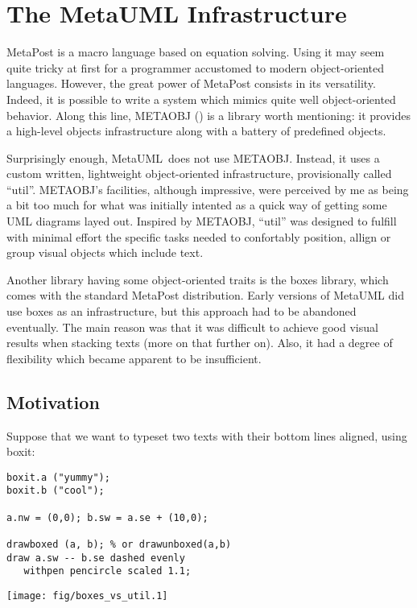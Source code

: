 \documentclass{article}
\newcommand{\code}{\ttfamily}
\newcommand{\metauml}{MetaUML}
\begin{document}
\section{The MetaUML Infrastructure}
\label{section:infrastructure}

MetaPost is a macro language based on equation solving. Using it may seem quite
tricky at first for a programmer accustomed to modern object-oriented languages.
However, the great power of MetaPost consists in its versatility. Indeed, it is possible to write
a system which mimics quite well object-oriented behavior. Along this line, METAOBJ
(\cite{metaobj}) is a library worth mentioning: it provides a high-level objects
infrastructure along with a battery of predefined objects.

Surprisingly enough, \metauml\ does not use METAOBJ. Instead, it uses a custom written,
lightweight object-oriented infrastructure, provisionally called ``{\code util}''.
METAOBJ's facilities, although impressive, were perceived by me as being a bit too much
for what was initially intented as a quick way of getting some UML diagrams layed out.
Inspired by METAOBJ, ``{\code util}'' was designed to fulfill with minimal effort
the specific tasks needed to confortably position, allign or group visual objects
which include text.

Another library having some object-oriented traits is the {\code boxes}
library, which comes with the standard MetaPost distribution. Early versions of
MetaUML did use {\code boxes} as an infrastructure, but this approach had to be abandoned eventually.
The main reason was that it was difficult to achieve good visual results when stacking texts
(more on that further on). Also, it had a degree of flexibility which became apparent to be
insufficient.

\subsection{Motivation}

Suppose that we want to typeset two texts with their bottom lines aligned, using {\code boxit}:

\begin{multicols}{2}
\begin{verbatim}
boxit.a ("yummy");
boxit.b ("cool");

a.nw = (0,0); b.sw = a.se + (10,0);

drawboxed (a, b); % or drawunboxed(a,b)
draw a.sw -- b.se dashed evenly
   withpen pencircle scaled 1.1;
\end{verbatim}
\columnbreak
\hspace{1cm}\texttt{[image: fig/boxes\_vs\_util.1]}
\end{multicols}
\end{document}
